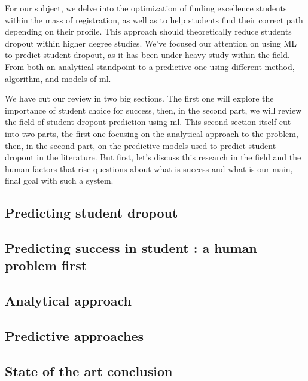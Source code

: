 \documentclass[../main.tex]{subfiles}
\begin{document}
For our subject, we delve into the optimization of finding excellence students within the mass of registration, as well as to help students find their correct path depending on their profile. This approach should theoretically reduce students dropout within higher degree studies.
We've focused our attention on using ML to predict student dropout, as it has been under heavy study within the field. From both an analytical standpoint to a predictive one using different method, algorithm, and models of \acrfull{ml}.

We have cut our review in two big sections. The first one will explore the importance of student choice for success, then, in the second part, we will review the field of student dropout prediction using \acrfull{ml}. This second section itself cut into two parts, the first one focusing on the analytical approach to the problem, then, in the second part, on the predictive models used to predict student dropout in the literature.
But first, let's discuss this research in the field and the human factors that rise questions about what is success and what is our main, final goal with such a system.

\subsection{Predicting student dropout}
\label{subsec:soa_predictingstudentdropout}


\vspace{4pt}
\subsection{Predicting success in student : a human problem first}
\label{subsubsec:soa_humanapproach}


\vspace{4pt}
\subsection{Analytical approach}
\label{subsubsec:soa_analyticalapproach}


\vspace{4pt}
\subsection{Predictive approaches}
\label{subsubsec:soa_predictiveapproach}


\vspace{8pt}
\subsection{State of the art conclusion}
\label{subsec:soa_cc}

\end{document}
